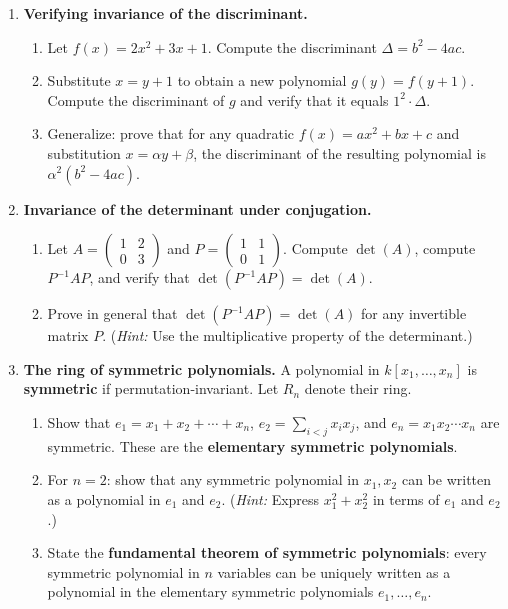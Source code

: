 \begin{enumerate}

    \item \textbf{Verifying invariance of the discriminant.}
    \begin{enumerate}
        \item Let $f(x) = 2x^2 + 3x + 1$. Compute the discriminant $\Delta = b^2 - 4ac$.
        \item Substitute $x = y + 1$ to obtain a new polynomial $g(y) = f(y+1)$. Compute the discriminant of $g$ and verify that it equals $1^2 \cdot \Delta$.
        \item Generalize: prove that for any quadratic $f(x) = ax^2 + bx + c$ and substitution $x = \alpha y + \beta$, the discriminant of the resulting polynomial is $\alpha^2(b^2 - 4ac)$.
    \end{enumerate}

    \item \textbf{Invariance of the determinant under conjugation.}
    \begin{enumerate}
        \item Let $A = \begin{pmatrix} 1 & 2 \\ 0 & 3 \end{pmatrix}$ and $P = \begin{pmatrix} 1 & 1 \\ 0 & 1 \end{pmatrix}$. Compute $\det(A)$, compute $P^{-1}AP$, and verify that $\det(P^{-1}AP) = \det(A)$.
        \item Prove in general that $\det(P^{-1}AP) = \det(A)$ for any invertible matrix $P$. (\emph{Hint:} Use the multiplicative property of the determinant.)
    \end{enumerate}

    \item \textbf{The ring of symmetric polynomials.} A polynomial in $k[x_1,\dots,x_n]$ is \textbf{symmetric} if permutation-invariant. Let $R_n$ denote their ring.
    \begin{enumerate}
        \item Show that $e_1 = x_1 + x_2 + \cdots + x_n$, $e_2 = \sum_{i<j} x_i x_j$, and $e_n = x_1 x_2 \cdots x_n$ are symmetric. These are the \textbf{elementary symmetric polynomials}.
        \item For $n = 2$: show that any symmetric polynomial in $x_1, x_2$ can be written as a polynomial in $e_1$ and $e_2$. (\emph{Hint:} Express $x_1^2 + x_2^2$ in terms of $e_1$ and $e_2$.)
        \item State the \textbf{fundamental theorem of symmetric polynomials}: every symmetric polynomial in $n$ variables can be uniquely written as a polynomial in the elementary symmetric polynomials $e_1, \ldots, e_n$.
    \end{enumerate}


\end{enumerate}
